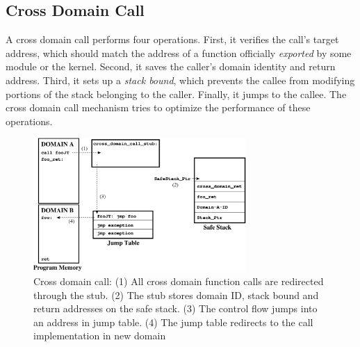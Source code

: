 \subsection{Cross Domain Call}
\label{sec:crossdomcall}
%
%
%
%
A cross domain call performs four operations.
%
First, it verifies the call's target address, which
%
should match the address of a function officially \emph{exported} by some
module or the kernel.
%
Second, it saves the caller's domain identity and return address.
%
Third, it sets up a \emph{stack bound}, which prevents the callee from
modifying portions of the stack belonging to the caller.
%
Finally, it jumps to the callee.
%
%
The cross domain call mechanism tries to optimize the performance of these operations.
%

\begin{figure}[htbp]
   \centering
   \includegraphics[height=2.0in, keepaspectratio=true]{figures/cross_domain_call_step.eps} 
   \caption[Cross domain call operation]{Cross domain call: (1) All
     cross domain function calls are redirected through the stub. (2)
     The stub stores domain ID, stack bound and return addresses on
     the safe stack. (3) The control flow jumps into an address in
     jump table. (4) The jump table redirects to the call
     implementation in new domain}
   \label{fig:cross_domain_call}
\end{figure}


